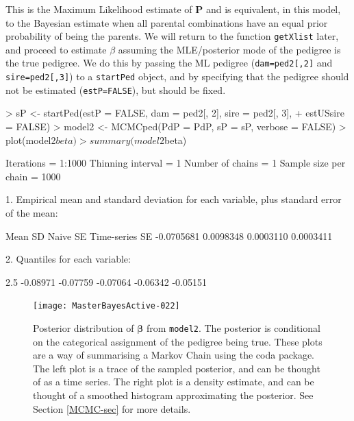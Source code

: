 \documentclass{article}
\begin{document}
This is the Maximum Likelihood estimate of ${\bm P}$ and is equivalent, in this model, to the Bayesian estimate when all parental combinations have an equal prior probability of being the parents.  We will return to the function \texttt{getXlist} later, and proceed to estimate $\beta$ assuming the MLE/posterior mode of the pedigree is the true pedigree.  We do this by passing the ML pedigree (\texttt{dam=ped2[,2]} and \texttt{sire=ped2[,3]}) to a \texttt{startPed} object, and by specifying that the pedigree should not be estimated (\texttt{estP=FALSE}), but should be fixed.

\begin{Schunk}
\begin{Sinput}
> sP <- startPed(estP = FALSE, dam = ped2[, 2], sire = ped2[, 3], 
+     estUSsire = FALSE)
> model2 <- MCMCped(PdP = PdP, sP = sP, verbose = FALSE)
> plot(model2$beta)
> summary(model2$beta)
\end{Sinput}
\begin{Soutput}
Iterations = 1:1000
Thinning interval = 1 
Number of chains = 1 
Sample size per chain = 1000 

1. Empirical mean and standard deviation for each variable,
   plus standard error of the mean:

          Mean             SD       Naive SE Time-series SE 
    -0.0705681      0.0098348      0.0003110      0.0003411 

2. Quantiles for each variable:

    2.5%
-0.08971 -0.07759 -0.07064 -0.06342 -0.05151 
\end{Soutput}
\end{Schunk}



\begin{figure}[!h]
\begin{center}
\texttt{[image: MasterBayesActive-022]}
\end{center}
\caption{Posterior distribution of $\bm{\beta}$ from \texttt{model2}. The posterior is conditional on the categorical assignment of the pedigree being true. These plots are a way of summarising a Markov Chain using the coda package.  The left plot is a trace of the sampled posterior, and can be thought of as a time series.  The right plot is a density estimate, and can be thought of a smoothed histogram approximating the posterior.  See Section \ref{MCMC-sec} for more details.}
\label{model2beta}
\end{figure}
\end{document}
